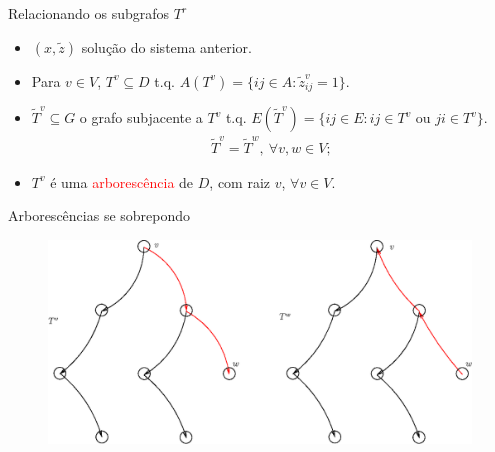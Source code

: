 \documentclass[dvipsnames]{beamer}
\newtheorem{fato}{Fato}
\begin{document}
\begin{frame}{Relacionando os subgrafos $T^{r}$ \hyperlink{arb_diferentes}{}}
  \hypertarget{rel_subgrafos}{}
  \begin{itemize}
  \item $(x,\tilde{z})$ solução do sistema anterior.
  \item Para $v \in V$, $T^{v} \subseteq D$ t.q. $A(T^{v}) = \{ ij \in A: \tilde{z}_{ij}^{v} = 1 \}$.
  \item 
    $\widetilde{T}^{v} \subseteq G$ o grafo subjacente
    a $T^{v}$ t.q. \mbox{$E(\widetilde{T}^{v}) = \{ij \in E: ij \in T^{v} \text{ ou }ji \in T^{v}\}$}.\\


\begin{align*}
  \widetilde{T}^{v} = \widetilde{T}^{w}, \: \forall v, w \in V;
\end{align*}

  \item $T^{v}$ é uma \textcolor{red}{arborescência} de $D$, com raiz $v$, $\forall v \in V$.
    

  \end{itemize}
  
\end{frame}


\begin{frame}{Arborescências se sobrepondo \hyperlink{form_1}{\beamergotobutton{$\leftarrow$}}}
  \hypertarget{arb_iguais}{}
  \begin{figure}[H]
\centering
%
\includegraphics[scale=0.55]{figures/arb_iguais.eps}
\label{fig:fig1}
\end{figure}
\end{frame}
\end{document}
